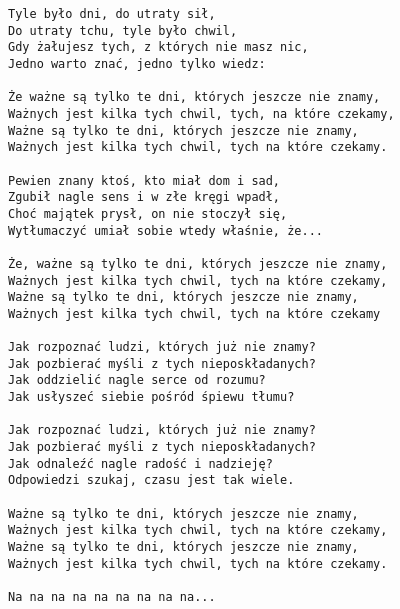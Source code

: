 \documentclass[12pt]{article}
\begin{document}
\begin{verbatim}
Tyle było dni, do utraty sił,
Do utraty tchu, tyle było chwil,
Gdy żałujesz tych, z których nie masz nic,
Jedno warto znać, jedno tylko wiedz:

Że ważne są tylko te dni, których jeszcze nie znamy,
Ważnych jest kilka tych chwil, tych, na które czekamy,
Ważne są tylko te dni, których jeszcze nie znamy,
Ważnych jest kilka tych chwil, tych na które czekamy.

Pewien znany ktoś, kto miał dom i sad,
Zgubił nagle sens i w złe kręgi wpadł,
Choć majątek prysł, on nie stoczył się,
Wytłumaczyć umiał sobie wtedy właśnie, że...

Że, ważne są tylko te dni, których jeszcze nie znamy,
Ważnych jest kilka tych chwil, tych na które czekamy,
Ważne są tylko te dni, których jeszcze nie znamy,
Ważnych jest kilka tych chwil, tych na które czekamy

Jak rozpoznać ludzi, których już nie znamy?
Jak pozbierać myśli z tych nieposkładanych?
Jak oddzielić nagle serce od rozumu?
Jak usłyszeć siebie pośród śpiewu tłumu?

Jak rozpoznać ludzi, których już nie znamy?
Jak pozbierać myśli z tych nieposkładanych?
Jak odnaleźć nagle radość i nadzieję?
Odpowiedzi szukaj, czasu jest tak wiele.

Ważne są tylko te dni, których jeszcze nie znamy,
Ważnych jest kilka tych chwil, tych na które czekamy,
Ważne są tylko te dni, których jeszcze nie znamy,
Ważnych jest kilka tych chwil, tych na które czekamy.

Na na na na na na na na na...
\end{verbatim}
\clearpage
\end{document}
